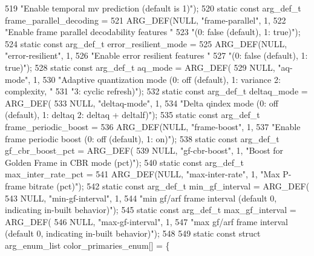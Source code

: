\begin{DoxyCodeInclude}
{{{{{{{519         \textcolor{stringliteral}{"Enable temporal mv prediction (default is 1)"});
520 \textcolor{keyword}{static} \textcolor{keyword}{const} arg\_def\_t frame\_parallel\_decoding =
521     ARG\_DEF(NULL, \textcolor{stringliteral}{"frame-parallel"}, 1,
522         \textcolor{stringliteral}{"Enable frame parallel decodability features "}
523         \textcolor{stringliteral}{"(0: false (default), 1: true)"});
524 \textcolor{keyword}{static} \textcolor{keyword}{const} arg\_def\_t error\_resilient\_mode =
525     ARG\_DEF(NULL, \textcolor{stringliteral}{"error-resilient"}, 1,
526         \textcolor{stringliteral}{"Enable error resilient features "}
527         \textcolor{stringliteral}{"(0: false (default), 1: true)"});
528 \textcolor{keyword}{static} \textcolor{keyword}{const} arg\_def\_t aq\_mode = ARG\_DEF(
529     NULL, \textcolor{stringliteral}{"aq-mode"}, 1,
530     \textcolor{stringliteral}{"Adaptive quantization mode (0: off (default), 1: variance 2: complexity, "}
531     \textcolor{stringliteral}{"3: cyclic refresh)"});
532 \textcolor{keyword}{static} \textcolor{keyword}{const} arg\_def\_t deltaq\_mode = ARG\_DEF(
533     NULL, \textcolor{stringliteral}{"deltaq-mode"}, 1,
534     \textcolor{stringliteral}{"Delta qindex mode (0: off (default), 1: deltaq 2: deltaq + deltalf)"});
535 \textcolor{keyword}{static} \textcolor{keyword}{const} arg\_def\_t frame\_periodic\_boost =
536     ARG\_DEF(NULL, \textcolor{stringliteral}{"frame-boost"}, 1,
537         \textcolor{stringliteral}{"Enable frame periodic boost (0: off (default), 1: on)"});
538 \textcolor{keyword}{static} \textcolor{keyword}{const} arg\_def\_t gf\_cbr\_boost\_pct = ARG\_DEF(
539     NULL, \textcolor{stringliteral}{"gf-cbr-boost"}, 1, \textcolor{stringliteral}{"Boost for Golden Frame in CBR mode (pct)"});
540 \textcolor{keyword}{static} \textcolor{keyword}{const} arg\_def\_t max\_inter\_rate\_pct =
541     ARG\_DEF(NULL, \textcolor{stringliteral}{"max-inter-rate"}, 1, \textcolor{stringliteral}{"Max P-frame bitrate (pct)"});
542 \textcolor{keyword}{static} \textcolor{keyword}{const} arg\_def\_t min\_gf\_interval = ARG\_DEF(
543     NULL, \textcolor{stringliteral}{"min-gf-interval"}, 1,
544     \textcolor{stringliteral}{"min gf/arf frame interval (default 0, indicating in-built behavior)"});
545 \textcolor{keyword}{static} \textcolor{keyword}{const} arg\_def\_t max\_gf\_interval = ARG\_DEF(
546     NULL, \textcolor{stringliteral}{"max-gf-interval"}, 1,
547     \textcolor{stringliteral}{"max gf/arf frame interval (default 0, indicating in-built behavior)"});
548 
549 \textcolor{keyword}{static} \textcolor{keyword}{const} \textcolor{keyword}{struct }arg\_enum\_list color\_primaries\_enum[] = \{
}}}}}}}
\end{DoxyCodeInclude}
